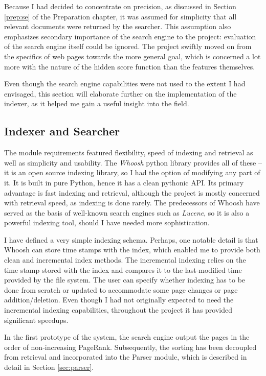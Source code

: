 \documentclass[12pt,notitlepage,twoside]{scrreprt}
\begin{document}
Because I had decided to concentrate on precision, as discussed in Section \ref{prep:se}
of the Preparation chapter, it was assumed for simplicity that all relevant documents were
returned by the searcher. This assumption also emphasizes secondary importance of the
search engine to the project: evaluation of the search engine itself could be ignored. The
project swiftly moved on from the specifics of web pages towards the more general goal,
which is concerned a lot more with the nature of the hidden score function than the
features themselves.

Even though the search engine capabilities were not used to the extent I had envisaged,
this section will elaborate further on the implementation of the indexer, as it helped me
gain a useful insight into the field.

\subsection{Indexer and Searcher}

The module requirements featured flexibility, speed of indexing and retrieval as well as
simplicity and usability.  The \textit{Whoosh} python library provides all of these -- it
is  an open source indexing library, so I had the option of modifying any part of it.  It
is  built in pure Python, hence it has a clean pythonic API. Its primary advantage is fast
indexing and retrieval, although the project is mostly concerned with retrieval speed, as
indexing is done rarely. The predecessors of Whoosh have served as the basis of well-known
search engines such as \textit{Lucene}, so it is also a powerful indexing tool, should I
have needed more sophistication.

I have defined a very simple indexing schema. Perhaps, one notable detail is that Whoosh
can store time stamps with the index, which enabled me to provide both clean and
incremental index methods. The incremental indexing relies on the time stamp stored with
the index and compares it to the last-modified time provided by the file system. The user
can specify whether indexing has to be done from scratch or updated to accommodate some
page changes or page addition/deletion. Even though I had not originally expected
to need the incremental indexing capabilities, throughout the project it has provided
significant speedups.

In the first prototype of the system, the search engine output the pages in the order of
non-increasing PageRank. Subsequently, the sorting has been decoupled from retrieval and
incorporated into the Parser module, which is described in detail in Section
\ref{sec:parser}.
\end{document}
